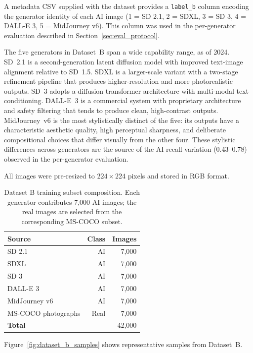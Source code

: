 A metadata CSV supplied with the dataset provides a \texttt{label\_b} column encoding the
generator identity of each AI image (1 = SD 2.1, 2 = SDXL, 3 = SD 3, 4 = DALL-E 3,
5 = MidJourney v6). This column was used in the per-generator evaluation described in
Section~\ref{sec:eval_protocol}.

The five generators in Dataset~B span a wide capability range, as of 2024. SD~2.1 is a
second-generation latent diffusion model with improved text-image alignment relative to
SD~1.5. SDXL is a larger-scale variant with a two-stage refinement pipeline that
produces higher-resolution and more photorealistic outputs. SD~3 adopts a diffusion
transformer architecture with multi-modal text conditioning. DALL-E~3 is a commercial
system with proprietary architecture and safety filtering that tends to produce clean,
high-contrast outputs. MidJourney~v6 is the most stylistically distinct of the five:
its outputs have a characteristic aesthetic quality, high perceptual sharpness, and
deliberate compositional choices that differ visually from the other four. These
stylistic differences across generators are the source of the AI recall variation
(0.43--0.78) observed in the per-generator evaluation.

All images were pre-resized to $224 \times 224$ pixels and stored in RGB format.
\begin{table}[h!]
  \centering
  \caption{Dataset B training subset composition. Each generator contributes 7,000 AI images;
           the real images are selected from the corresponding MS-COCO subset.}
  \label{tab:dataset_b_splits}
  \begin{tabular}{lrr}
    \hline
    \textbf{Source} & \textbf{Class} & \textbf{Images} \\
    \hline
    SD 2.1         & AI   & 7,000 \\
    SDXL           & AI   & 7,000 \\
    SD 3           & AI   & 7,000 \\
    DALL-E 3       & AI   & 7,000 \\
    MidJourney v6  & AI   & 7,000 \\
    MS-COCO photographs & Real & 7,000 \\
    \hline
    \textbf{Total} &      & 42,000 \\
    \hline
  \end{tabular}
\end{table}

Figure~\ref{fig:dataset_b_samples} shows representative samples from Dataset~B.

